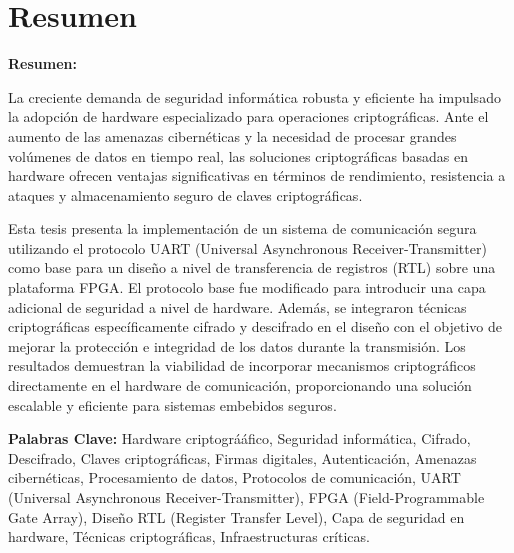 \chapter{Resumen}


\textbf{Resumen:}

La creciente demanda de seguridad inform\'atica robusta y eficiente ha impulsado la adopci\'on de hardware especializado para operaciones criptogr\'aficas. Ante el aumento de las amenazas cibern\'eticas y la necesidad de procesar grandes vol\'umenes de datos en tiempo real, las soluciones criptogr\'aficas basadas en hardware ofrecen ventajas significativas en t\'erminos de rendimiento, resistencia a ataques y almacenamiento seguro de claves criptogr\'aficas.

Esta tesis presenta la implementaci\'on de un sistema de comunicaci\'on segura utilizando el protocolo UART (Universal Asynchronous Receiver-Transmitter) como base para un diseño a nivel de transferencia de registros (RTL) sobre una plataforma FPGA. El protocolo base fue modificado para introducir una capa adicional de seguridad a nivel de hardware. Adem\'as, se integraron t\'ecnicas criptogr\'aficas espec\'ificamente cifrado y descifrado en el diseño con el objetivo de mejorar la protecci\'on e integridad de los datos durante la transmisi\'on. Los resultados demuestran la viabilidad de incorporar mecanismos criptogr\'aficos directamente en el hardware de comunicaci\'on, proporcionando una soluci\'on escalable y eficiente para sistemas embebidos seguros.



\textbf{Palabras Clave:} Hardware criptográ\'afico, Seguridad inform\'atica, Cifrado, Descifrado, Claves criptogr\'aficas, Firmas digitales, Autenticaci\'on, Amenazas cibern\'eticas, Procesamiento de datos, Protocolos de comunicaci\'on, UART (Universal Asynchronous Receiver-Transmitter), FPGA (Field-Programmable Gate Array), Diseño RTL (Register Transfer Level), Capa de seguridad en hardware, T\'ecnicas criptogr\'aficas, Infraestructuras cr\'iticas. \\




\endinput 